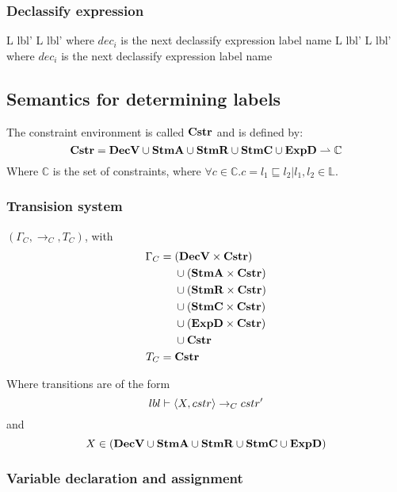 \subsubsection{Declassify expression}

\begin{trules}
        { {L} {lbl'} }
        { {L} {lbl'} }
        {where $dec_i$ is the next declassify expression label name}
        { {L} {lbl'} }
        { {L} {lbl'} }
        {where $dec_i$ is the next declassify expression label name}
\end{trules}

\subsection{Semantics for determining labels}
The constraint environment is called $\mathbf{Cstr}$ and is defined by:
\[
  \mathbf{Cstr} = \mathbf{DecV} \cup \mathbf{StmA} \cup \mathbf{StmR} \cup \mathbf{StmC} \cup \mathbf{ExpD} \rightharpoonup \mathbb{C}
\]
Where $\mathbb{C}$ is the set of constraints, where $\forall c \in \mathbb{C} . c = l_1 \sqsubseteq l_2 | l_1, l_2 \in \mathbb{L}$.

\subsubsection{Transision system}
$(\Gamma_{C}, \rightarrow_{C}, T_{C})$, with
\begin{align*}
  \Gamma_{C} =  & \;        (\mathbf{DecV} \times \mathbf{Cstr}) \\
                & \;  \cup  (\mathbf{StmA} \times \mathbf{Cstr}) \\
                & \;  \cup  (\mathbf{StmR} \times \mathbf{Cstr}) \\
                & \;  \cup  (\mathbf{StmC} \times \mathbf{Cstr}) \\
                & \;  \cup  (\mathbf{ExpD} \times \mathbf{Cstr}) \\
                & \;  \cup   \mathbf{Cstr} \\
  T_{C} =       & \;  \mathbf{Cstr}
\end{align*}

\noindent Where transitions are of the form
  \[ lbl \vdash \langle X, cstr \rangle \rightarrow_{C} cstr' \]
  and
  \[ X \in (\mathbf{DecV} \cup \mathbf{StmA} \cup \mathbf{StmR} \cup \mathbf{StmC} \cup \mathbf{ExpD}) \]

\subsubsection{Variable declaration and assignment}


